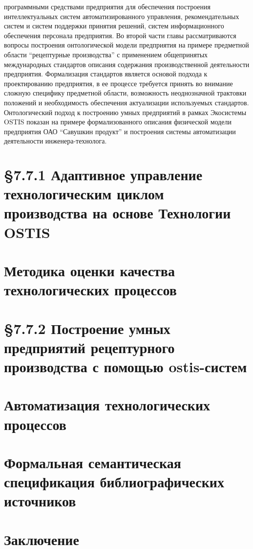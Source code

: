 \begin{small}
программными средствами предприятия для обеспечения построения интеллектуальных систем автоматизированного управления, рекомендательных систем и систем поддержки принятия решений, систем информационного
обеспечения персонала предприятия.
Во второй части главы рассматриваются вопросы построения онтологической модели предприятия на примере предметной области “рецептурные производства” с применением общепринятых международных стандартов описания
содержания производственной деятельности предприятия. Формализация стандартов является основой подхода
к проектированию предприятия, в ее процессе требуется принять во внимание сложную специфику предметной
области, возможность неоднозначной трактовки положений и необходимость обеспечения актуализации используемых стандартов. Онтологический подход к построению умных предприятий в рамках Экосистемы OSTIS показан
на примере формализованного описания физической модели предприятия ОАО “Савушкин продукт” и построения
системы автоматизации деятельности инженера-технолога.
\end{small}
\begin{small}
\section*{\S 7.7.1 Адаптивное управление технологическим циклом производства на основе
Технологии OSTIS}
\section*{Методика оценки качества технологических процессов}
\end{small}

\section*{\S 7.7.2 Построение умных предприятий рецептурного производства с помощью
ostis-систем}
\section*{Автоматизация технологических процессов}

\newpage
\section{Формальная семантическая спецификация библиографических источников}



\newpage
\section*{Заключение}

